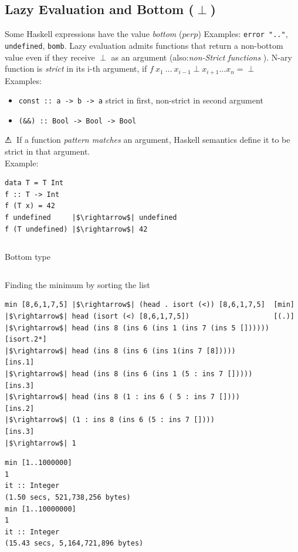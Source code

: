 \documentclass{article}
\newcommand{\Haskell}[1]{\texttt{#1}}
\begin{document}
\subsection{Lazy Evaluation and Bottom ($\perp$)}
Some Haskell expressions have the value \emph{bottom} ($perp$) Examples: \Haskell{error ".."}, \Haskell{undefined}, \Haskell{bomb}. Lazy evaluation admits functions that return a non-bottom value even if they receive $\perp$ as an argument (also:{\em non-Strict functions }).
N-ary function is \emph{strict} in its i-th argument, if $f\ x_1\ \ldots\ x_{i-1} \perp x_{i+1} \ldots x_n = \perp$\\
Examples:
\begin{itemize}
\item \Haskell{const :: a -> b -> a} strict in first, non-strict in second argument
\item \Haskell{(&&) :: Bool -> Bool -> Bool}
\end{itemize}
$\bigtriangleup\! \hspace*{-0.45em}!\hspace*{0.45em}$ If a function \emph{pattern matches} an argument, Haskell semantics define it to be strict in that argument.\\
Example:\\
\begin{verbatim}
data T = T Int
f :: T -> Int
f (T x) = 42
f undefined     |$\rightarrow$| undefined
f (T undefined) |$\rightarrow$| 42
\end{verbatim}
\begin{listing}[h!]
\inputminted{Haskell}{bottom.hs}
\caption{Bottom type}
\end{listing}
\begin{listing}[h!]
\inputminted{Haskell}{min.hs}
\caption{Finding the minimum by sorting the list}
\end{listing}
\begin{verbatim}
min [8,6,1,7,5] |$\rightarrow$| (head . isort (<)) [8,6,1,7,5]  [min]
|$\rightarrow$| head (isort (<) [8,6,1,7,5])                    [(.)]
|$\rightarrow$| head (ins 8 (ins 6 (ins 1 (ins 7 (ins 5 []))))) [isort.2*]
|$\rightarrow$| head (ins 8 (ins 6 (ins 1(ins 7 [8]))))         [ins.1]
|$\rightarrow$| head (ins 8 (ins 6 (ins 1 (5 : ins 7 []))))     [ins.3]
|$\rightarrow$| head (ins 8 (1 : ins 6 ( 5 : ins 7 [])))        [ins.2]
|$\rightarrow$| (1 : ins 8 (ins 6 (5 : ins 7 [])))              [ins.3]
|$\rightarrow$| 1
\end{verbatim}
\begin{verbatim}
min [1..1000000]
1
it :: Integer
(1.50 secs, 521,738,256 bytes)
min [1..10000000]
1
it :: Integer
(15.43 secs, 5,164,721,896 bytes)
\end{verbatim}
\end{document}

